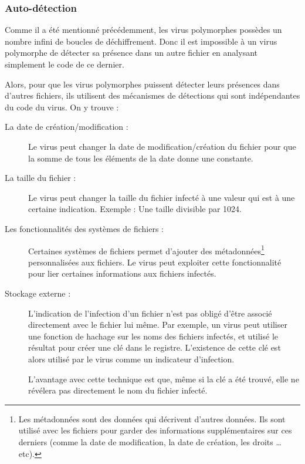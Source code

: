         \subsubsection{Auto-détection}
        Comme il a été mentionné précédemment, les virus polymorphes possèdes un nombre infini de boucles de 
        déchiffrement. Donc il est impossible à un virus polymorphe de détecter sa présence dans un autre fichier en 
        analysant simplement le code de ce dernier. 

        Alors, pour que les virus polymorphes puissent détecter leurs présences dans d'autres fichiers, ils utilisent
        des mécanismes de détections qui sont indépendantes du code du virus. On y trouve :
        \begin{description}
            \item[La date de création/modification :] Le virus peut changer la date de modification/création
                du fichier pour que la somme de tous les éléments de la date donne une constante.
            \item[La taille du fichier :] Le virus peut changer la taille du fichier infecté à une valeur qui est 
                à une certaine indication. Exemple : Une taille divisible par 1024.
            \item[Les fonctionnalités des systèmes de fichiers :] Certaines systèmes de fichiers permet 
                d'ajouter des métadonnées\footnote{
                Les métadonnées sont des données qui décrivent d'autres données. 
                Ils sont utilisé avec les fichiers pour garder des informations supplémentaires sur ces derniers 
                (comme la date de modification, la date de création, les droits \ldots{} etc).} 
                personnalisées aux fichiers. Le virus peut exploiter cette fonctionnalité pour lier 
                certaines informations aux fichiers infectés.
            \item[Stockage externe :] L'indication de l'infection d'un fichier n'est pas obligé d'être associé
                directement avec le fichier lui même. Par exemple, un virus peut utiliser une fonction de hachage 
                sur les noms des fichiers infectés, et utilisé le résultat pour créer une clé dans le registre.
                L'existence de cette clé est alors utilisé par le virus comme un indicateur d'infection.

                L'avantage avec cette technique est que, même si la clé a été trouvé, elle ne révélera pas directement 
                le nom du fichier infecté. 
            \end{description}

